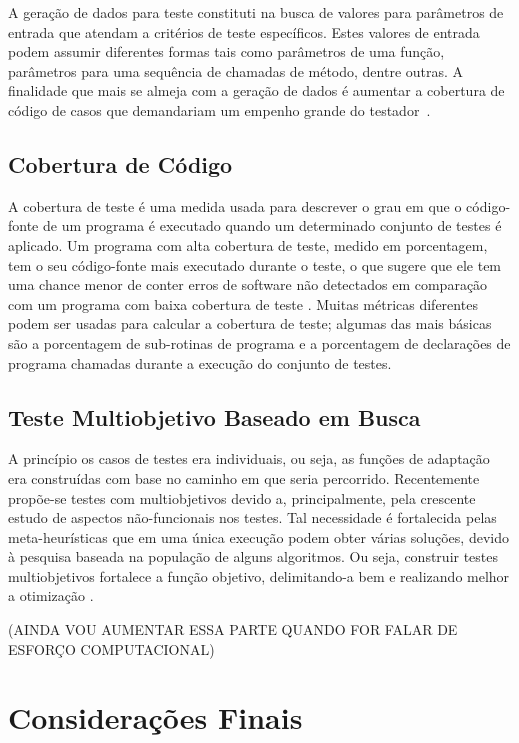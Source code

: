 A geração de dados para teste constituti na busca de valores para parâmetros de entrada que atendam a critérios de teste específicos. Estes valores de entrada podem assumir diferentes formas tais como parâmetros de uma função, parâmetros para uma sequência de chamadas de método, dentre outras. A finalidade que mais se almeja com a geração de dados é aumentar a cobertura de código de casos que demandariam um empenho grande do testador~\cite{huo2017genetic}.

\subsection{Cobertura de Código}

A cobertura de teste é uma medida usada para descrever o grau em que o código-fonte de um programa é executado quando um determinado conjunto de testes é aplicado. Um programa com alta cobertura de teste, medido em porcentagem, tem o seu código-fonte mais executado durante o teste, o que sugere que ele tem uma chance menor de conter erros de software não detectados em comparação com um programa com baixa cobertura de teste \cite{yang2009survey}. Muitas métricas diferentes podem ser usadas para calcular a cobertura de teste; algumas das mais básicas são a porcentagem de sub-rotinas de programa e a porcentagem de declarações de programa chamadas durante a execução do conjunto de testes.

\subsection{Teste Multiobjetivo Baseado em Busca}

A princípio os casos de testes era individuais, ou seja, as funções de adaptação era construídas com base no caminho em que seria percorrido. Recentemente propõe-se testes com multiobjetivos devido a, principalmente, pela
crescente estudo de aspectos não-funcionais nos testes. Tal necessidade é fortalecida pelas meta-heurísticas que em uma única execução podem obter várias soluções, devido à pesquisa baseada na população de alguns algoritmos. Ou seja, construir testes multiobjetivos fortalece a função objetivo, delimitando-a bem e realizando melhor a otimização \cite{huo2017genetic}. 

(AINDA VOU AUMENTAR ESSA PARTE QUANDO FOR FALAR DE ESFORÇO COMPUTACIONAL)

\section{Considerações Finais \label{sec:considFinRefTeor}}



